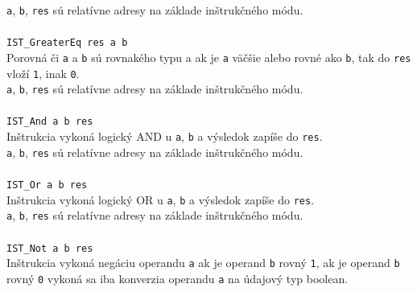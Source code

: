 \documentclass[12pt,a4paper,titlepage,final]{article}
\begin{document}
\texttt{a}, \texttt{b}, \texttt{res} sú relatívne adresy na základe inštrukčného módu.\\
\\\texttt{IST\_GreaterEq res a b}\\
Porovná či \texttt{a} a \texttt{b} sú rovnakého typu a ak je \texttt{a} väčšie alebo rovné ako \texttt{b}, tak do \texttt{res} vloží \texttt{1}, inak \texttt{0}.\\
\texttt{a}, \texttt{b}, \texttt{res} sú relatívne adresy na základe inštrukčného módu.\\
\\\texttt{IST\_And a b res}\\
Inštrukcia vykoná logický AND u \texttt{a}, \texttt{b} a výsledok zapíše do \texttt{res}.\\
\texttt{a}, \texttt{b}, \texttt{res} sú relatívne adresy na základe inštrukčného módu.\\
\\\texttt{IST\_Or a b res}\\
Inštrukcia vykoná logický OR u \texttt{a}, \texttt{b} a výsledok zapíše do \texttt{res}.\\
\texttt{a}, \texttt{b}, \texttt{res} sú relatívne adresy na základe inštrukčného módu.\\
\\\texttt{IST\_Not a b res}\\
Inštrukcia vykoná negáciu operandu \texttt{a} ak je operand \texttt{b} rovný \texttt{1}, ak je operand \texttt{b} rovný \texttt{0}
vykoná sa iba konverzia operandu \texttt{a} na údajový typ boolean.\\
\end{document}
